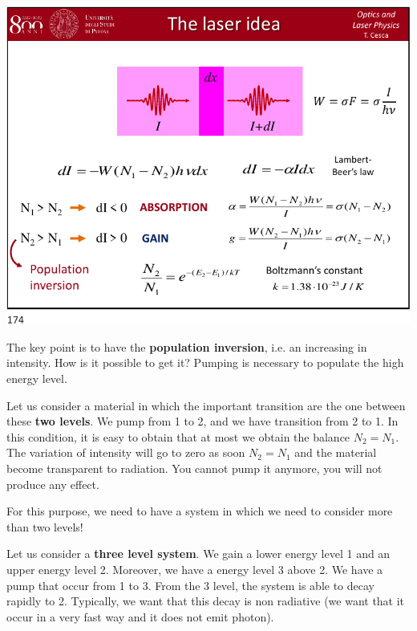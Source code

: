 \documentclass[../main/main.tex]{subfiles}
\begin{document}
\begin{minipage}[]{0.5\linewidth}
\centering
\includegraphics[page=3,width=1\textwidth]{../lessons/pdf_file/09_lecture.pdf}
\end{minipage}
\hspace{0.3cm}\vspace{0.3cm}
\begin{minipage}[c]{0.47\linewidth}

The key point is to have the \textbf{population inversion}, i.e. an increasing in intensity. How is it possible to get it?
Pumping is necessary to populate the high energy level.

Let us consider a material in which the important transition are the one between these \textbf{two levels}. We pump from 1 to 2, and we have transition from 2 to 1.
In this condition, it is easy to obtain that at most we obtain the balance \( N_2 = N_1 \). The variation of intensity will go to zero as soon \( N_2 = N_1 \) and the material become transparent to radiation. You cannot pump it anymore, you will not produce any effect.

For this purpose, we need to have a system in which we need to consider more than two levels!

\end{minipage}

Let us consider a \textbf{three level system}. We gain a lower energy level 1 and an upper energy level 2. Moreover, we have a energy level 3 above 2.
We have a pump that occur from 1 to 3. From the 3 level, the system is able to decay rapidly to 2. Typically, we want that this decay is non radiative (we want that it occur in a very fast way and it does not emit photon).
\end{document}
